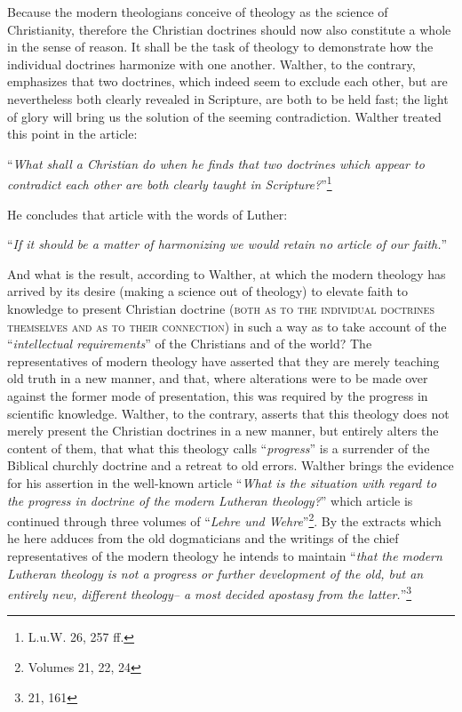                 Because the modern theologians conceive of theology as the science of Christianity, therefore the Christian doctrines should now also constitute a whole in the sense of reason.  It shall be the task of theology to demonstrate how the individual doctrines harmonize with one another.  Walther, to the contrary, emphasizes that two doctrines, which indeed seem to exclude each other, but are nevertheless both clearly revealed in Scripture, are both to be held fast; the light of glory will bring us the solution of the seeming contradiction.  Walther treated this point in the article: \begin{displayquote}“\textit{What shall a Christian do when he finds that two doctrines which appear to contradict each other are both clearly taught in Scripture?}”\footnote{L.u.W. 26, 257 ff.}\end{displayquote} He concludes that article with the words of Luther: \begin{displayquote}“\textit{If it should be a matter of harmonizing we would retain no article of our faith.}”\end{displayquote}

                And what is the result, according to Walther, at which the modern theology has arrived by its desire {\small(making a science out of theology)} to elevate faith to knowledge to present Christian doctrine {\scriptsize\textsc{ (both as to the individual doctrines themselves and as to their connection)}} in such a way as to take account of the “\textit{intellectual requirements}” of the Christians and of the world?  The representatives of modern theology have asserted that they are merely teaching old truth in a new manner, and that, where alterations were to be made over against the former mode of presentation, this was required by the progress in scientific knowledge.  Walther, to the contrary, asserts that this theology does not merely present the Christian doctrines in a new manner, but entirely alters the content of them, that what this theology calls “\textit{progress}” is a surrender of the Biblical churchly doctrine and a retreat to old errors.  Walther brings the evidence for his assertion in the well-known article “\textit{What is the situation with regard to the progress in doctrine of the modern Lutheran theology?}” which article is continued through three volumes of “\textit{Lehre und Wehre}''\footnote{Volumes 21, 22, 24}.  By the extracts which he here adduces from the old dogmaticians and the writings of the chief representatives of the modern theology he intends to maintain “\textit{that the modern Lutheran theology is not a progress or further development of the old, but an entirely new, different theology-- a most decided apostasy from the latter.}”\footnote{21, 161}

